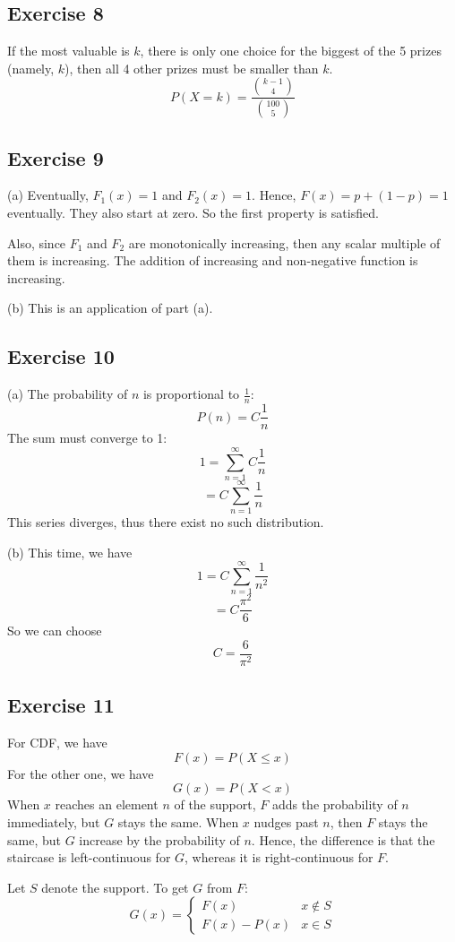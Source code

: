 \documentclass{book}
\begin{document}
\subsection*{Exercise 8}
If the most valuable is $k$, there is only one choice for the biggest of the 5 prizes (namely, $k$), then all 4 other prizes must be smaller than $k$.
$$P(X = k) = \frac{\binom{k - 1}{4}}{\binom{100}{5}}$$

\subsection*{Exercise 9}
(a) Eventually, $F_1(x) = 1$ and $F_2(x) = 1$. Hence, $F(x) = p + (1 - p) = 1$ eventually. They also start at zero. So the first property is satisfied.

Also, since $F_1$ and $F_2$ are monotonically increasing, then any scalar multiple of them is increasing. The addition of increasing and non-negative function is increasing.

\noindent
(b) This is an application of part (a).

\subsection*{Exercise 10}
(a) The probability of $n$ is proportional to $\frac{1}{n}$:
$$P(n) = C \frac{1}{n}$$
The sum must converge to 1:
$$1 = \sum_{n = 1}^\infty C \frac{1}{n}$$
$$= C \sum_{n = 1}^\infty \frac{1}{n}$$
This series diverges, thus there exist no such distribution.

\noindent
(b) This time, we have
$$1 = C \sum_{n = 1}^\infty \frac{1}{n^2}$$
$$= C \frac{\pi^2}{6}$$
So we can choose
$$C = \frac{6}{\pi^2}$$

\subsection*{Exercise 11}
For CDF, we have
$$F(x) = P(X \leq x)$$
For the other one, we have
$$G(x) = P(X < x)$$
When $x$ reaches an element $n$ of the support, $F$ adds the probability of $n$ immediately, but $G$ stays the same. When $x$ nudges past $n$, then $F$ stays the same, but $G$ increase by the probability of $n$. Hence, the difference is that the staircase is left-continuous for $G$, whereas it is right-continuous for $F$.

Let $S$ denote the support. To get $G$ from $F$:
$$G(x) =
\begin{cases} 
    F(x) & x \not \in S \\
    F(x) - P(x) & x \in S
\end{cases}
$$
\end{document}
